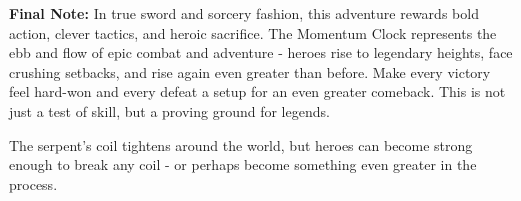 \documentclass[12pt,twoside]{article}
\begin{document}
\textbf{Final Note:}
In true sword and sorcery fashion, this adventure rewards bold action, clever tactics, and heroic sacrifice. The Momentum Clock represents the ebb and flow of epic combat and adventure - heroes rise to legendary heights, face crushing setbacks, and rise again even greater than before. Make every victory feel hard-won and every defeat a setup for an even greater comeback. This is not just a test of skill, but a proving ground for legends.

The serpent's coil tightens around the world, but heroes can become strong enough to break any coil - or perhaps become something even greater in the process.
\end{document}
